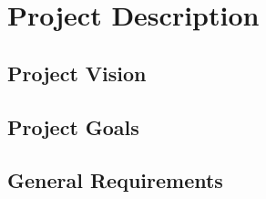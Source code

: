 \chapter{Project Description}
\section{Project Vision}

\section{Project Goals}

\section{General Requirements}
